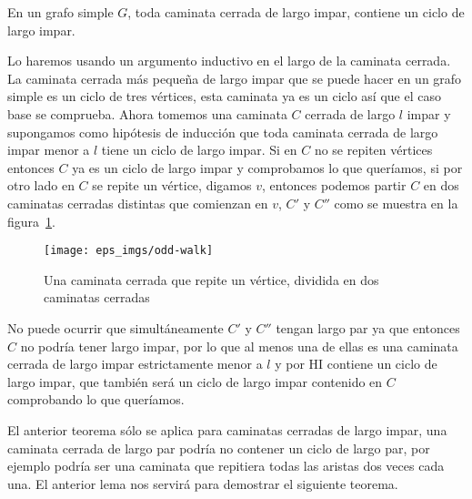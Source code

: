 \begin{lema}\label{teo:odd-walk}
En un grafo simple $G$, toda caminata cerrada de largo impar, contiene un ciclo de largo impar.

\begin{demostracion}
Lo haremos usando un argumento inductivo en el largo de la caminata cerrada.
La caminata cerrada más pequeña de largo impar que se puede hacer en un grafo simple es un ciclo de tres vértices, esta caminata ya es un ciclo así que el caso base se comprueba.
Ahora tomemos una caminata $C$ cerrada de largo $l$ impar y supongamos como hipótesis de inducción que toda caminata cerrada de largo impar menor a $l$ tiene un ciclo de largo impar.
Si en $C$ no se repiten vértices entonces $C$ ya es un ciclo de largo impar y comprobamos lo que queríamos, si por otro lado en $C$ se repite un vértice, digamos $v$, entonces podemos partir $C$ en dos caminatas cerradas distintas que comienzan en $v$, $C'$ y $C''$ como se muestra en la figura~\ref{fig:odd-walk}.
\begin{figure}[h!]
\centering
\texttt{[image: eps\_imgs/odd-walk]}
\caption{Una caminata cerrada que repite un vértice, dividida en dos caminatas cerradas}
\label{fig:odd-walk}
\end{figure}
No puede ocurrir que simultáneamente $C'$ y $C''$ tengan largo par ya que entonces $C$ no podría tener largo impar, por lo que al menos una de ellas es una caminata cerrada de largo impar estrictamente menor a $l$ y por HI contiene un ciclo de largo impar, que también será un ciclo de largo impar contenido en $C$ comprobando lo que queríamos.
\end{demostracion}
\end{lema}

El anterior teorema sólo se aplica para caminatas cerradas de largo impar, una caminata cerrada de largo par podría no contener un ciclo de largo par, por ejemplo podría ser una caminata que repitiera todas las aristas dos veces cada una.
El anterior lema nos servirá para demostrar el siguiente teorema.

